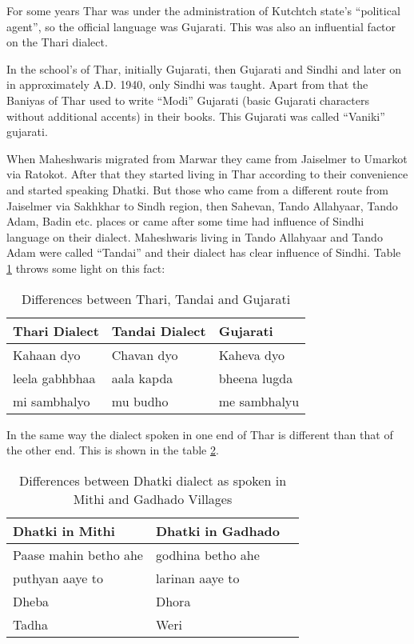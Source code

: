 For some years Thar was under the administration of Kutchtch state's ``political agent'', so the official language was Gujarati. This was also an influential factor on the Thari dialect.

In the school's of Thar, initially Gujarati, then Gujarati and Sindhi and later on in approximately A.D. 1940, only Sindhi was taught. Apart from that the Baniyas of Thar used to write ``Modi'' Gujarati (basic Gujarati characters without additional accents) in their books. This Gujarati was called ``Vaniki'' gujarati.

When Maheshwaris migrated from Marwar they came from Jaiselmer to Umarkot via Ratokot. After that they started living in Thar according to their convenience and started speaking Dhatki. But those who came from a different route from Jaiselmer via Sakhkhar to Sindh region, then Sahevan, Tando Allahyaar, Tando Adam, Badin etc. places or came after some time had influence of Sindhi language on their dialect. Maheshwaris living in Tando Allahyaar and Tando Adam were called ``Tandai'' and their dialect has clear influence of Sindhi. Table \ref{tbl:difftharitandaiguj} throws some light on this fact:
\begin{table}
\begin{center}
\begin{tabular}{lll}
\hline
\textbf{Thari Dialect} & \textbf{Tandai Dialect} & \textbf{Gujarati} \\
\hline
Kahaan dyo & Chavan dyo & Kaheva dyo \\ 
leela gabhbhaa & aala kapda & bheena lugda \\ 
mi sambhalyo & mu budho & me sambhalyu\\
\hline
\end{tabular}
\end{center}
\caption{Differences between Thari, Tandai and Gujarati}
\label{tbl:difftharitandaiguj}
\end{table}
In the same way the dialect spoken in one end of Thar is different than that of the other end. This is shown in the table \ref{tbl:diffmithigad}.
\begin{table}
\begin{center}
\begin{tabular}{lll}
\hline
\textbf{Dhatki in Mithi} & \textbf{Dhatki in Gadhado} \\
\hline
Paase mahin betho ahe & godhina betho ahe \\
puthyan aaye to & larinan aaye to \\
Dheba & Dhora\\
Tadha & Weri\\
\hline
\end{tabular}
\end{center}
\caption{Differences between Dhatki dialect as spoken in Mithi and Gadhado Villages}
\label{tbl:diffmithigad}
\end{table}
